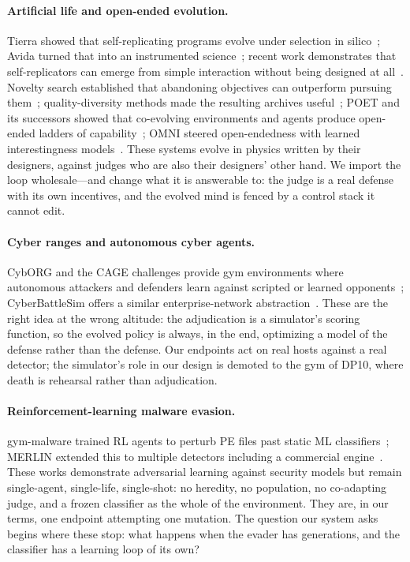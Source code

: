 \documentclass[11pt,a4paper]{article}
\begin{document}
\paragraph{Artificial life and open-ended evolution.} Tierra showed that self-replicating programs evolve under selection in silico~\cite{ray1991tierra}; Avida turned that into an instrumented science~\cite{ofria2004avida}; recent work demonstrates that self-replicators can emerge from simple interaction without being designed at all~\cite{aguera2024computational}. Novelty search established that abandoning objectives can outperform pursuing them~\cite{lehman2011novelty}; quality-diversity methods made the resulting archives useful~\cite{mouret2015mapelites,pugh2016qd}; POET and its successors showed that co-evolving environments and agents produce open-ended ladders of capability~\cite{wang2019poet,wang2020enhancedpoet}; OMNI steered open-endedness with learned interestingness models~\cite{zhang2024omni}. These systems evolve in physics written by their designers, against judges who are also their designers' other hand. We import the loop wholesale---and change what it is answerable to: the judge is a real defense with its own incentives, and the evolved mind is fenced by a control stack it cannot edit.

\paragraph{Cyber ranges and autonomous cyber agents.} CybORG and the CAGE challenges provide gym environments where autonomous attackers and defenders learn against scripted or learned opponents~\cite{cyborg2021}; CyberBattleSim offers a similar enterprise-network abstraction~\cite{cyberbattlesim2021}. These are the right idea at the wrong altitude: the adjudication is a simulator's scoring function, so the evolved policy is always, in the end, optimizing a model of the defense rather than the defense. Our endpoints act on real hosts against a real detector; the simulator's role in our design is demoted to the gym of DP10, where death is rehearsal rather than adjudication.

\paragraph{Reinforcement-learning malware evasion.} gym-malware trained RL agents to perturb PE files past static ML classifiers~\cite{anderson2018gymmalware}; MERLIN extended this to multiple detectors including a commercial engine~\cite{quertier2022merlin}. These works demonstrate adversarial learning against security models but remain single-agent, single-life, single-shot: no heredity, no population, no co-adapting judge, and a frozen classifier as the whole of the environment. They are, in our terms, one endpoint attempting one mutation. The question our system asks begins where these stop: what happens when the evader has generations, and the classifier has a learning loop of its own?
\end{document}
